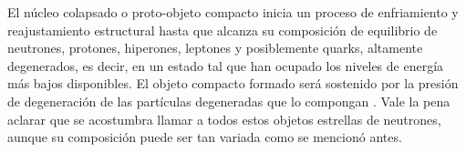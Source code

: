 El núcleo colapsado o proto-objeto compacto inicia un proceso de enfriamiento y reajustamiento estructural hasta que alcanza su composición de equilibrio de neutrones, protones, hiperones, leptones y posiblemente quarks, altamente degenerados, es decir, en un estado tal que han ocupado los niveles de energía más bajos disponibles. El objeto compacto formado será sostenido por la presión de degeneración de las partículas degeneradas que lo compongan \cite{Glendenning2000CompactStars}. Vale la pena aclarar que se acostumbra llamar a todos estos objetos estrellas de neutrones, aunque su composición puede ser tan variada como se mencionó antes.     
